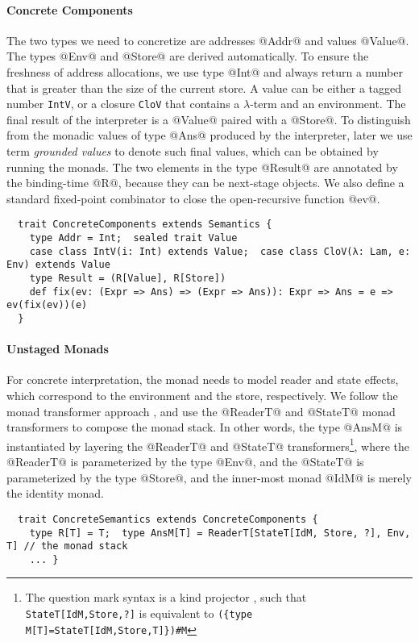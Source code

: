 \paragraph{Concrete Components}
The two types we need to concretize are addresses @Addr@ and values @Value@. The
types @Env@ and @Store@ are derived automatically. To ensure the freshness of
address allocations, we use type @Int@ and always return a number that is greater
than the size of the current store.
A value can be either a tagged number \texttt{IntV}, or a closure
\texttt{CloV} that contains a $\lambda$-term and an environment. The final
result of the interpreter is a @Value@ paired with a @Store@.
To distinguish from the monadic values of type @Ans@ produced by the
interpreter, later we use term \textit{grounded values} to denote such final values,
which can be obtained by running the monads.
The two elements in the type @Result@ are annotated by the binding-time @R@,
because they can be next-stage objects.  We also define a standard fixed-point
combinator to close the open-recursive function @ev@.
\begin{lstlisting}
  trait ConcreteComponents extends Semantics {
    type Addr = Int;  sealed trait Value
    case class IntV(i: Int) extends Value;  case class CloV(λ: Lam, e: Env) extends Value
    type Result = (R[Value], R[Store])
    def fix(ev: (Expr => Ans) => (Expr => Ans)): Expr => Ans = e => ev(fix(ev))(e)
  }
\end{lstlisting}

\paragraph{Unstaged Monads}
For concrete interpretation, the monad needs to model reader and state effects,
which correspond to the environment and the store, respectively. We follow the
monad transformer approach \cite{DBLP:conf/popl/LiangHJ95},
and use the @ReaderT@ and @StateT@ monad transformers to
compose the monad stack. In other words, the type @AnsM@ is
instantiated by layering the @ReaderT@ and @StateT@ transformers\footnote{The
question mark syntax is a kind projector \cite{kindprojector}, such that
\texttt{StateT[IdM,Store,?]} is equivalent to \newline \texttt{(\{type
M[T]=StateT[IdM,Store,T]\})\#M}}, where the @ReaderT@ is parameterized by the
type @Env@, and the @StateT@ is parameterized by the type @Store@, and the
inner-most monad @IdM@ is merely the identity monad.
\begin{lstlisting}
  trait ConcreteSemantics extends ConcreteComponents {
    type R[T] = T;  type AnsM[T] = ReaderT[StateT[IdM, Store, ?], Env, T] // the monad stack
    ... }
\end{lstlisting}

